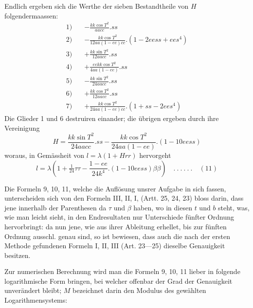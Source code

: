 %
Endlich ergeben sich die Werthe der sieben Bestandtheile von \(H\) folgendermaassen:
\[
\begin{aligned}
1)\quad&-\frac{kk\cos T^2}{aacc}\mathord{.}ss\\
2)\quad&-\frac{kk\cos T^2}{12aa(1-ee)cc}\mathord{.}(1-2eess+ees^4)\\
3)\quad&+\frac{kk\sin T^2}{12aacc}\mathord{.}ss\\
4)\quad&+\frac{eekk\cos T^2}{4aa(1-ee)}\mathord{.}ss\\
5)\quad&-\frac{kk\sin T^2}{24aacc}\mathord{.}ss\\
6)\quad&+\frac{kk\cos T^2}{12aacc}\mathord{.}ss\\
7)\quad&+\frac{kk\cos T^2}{24aa(1-ee)cc}\mathord{.}(1+ss-2ees^4)
\end{aligned}
\]
Die Glieder 1 und 6 destruiren einander; die übrigen ergeben durch ihre Vereinigung
\[
H=\frac{kk\sin T^2}{24aacc}\mathord{.}ss-\frac{kk\cos T^2}{24aa(1-ee)}\mathord{.}(1-10eess)
\]
woraus, in Gemässheit von \(l=\lambda(1+Hrr)\) hervorgeht
\[
l=\lambda(1+\tfrac1{24}\tau\tau-\frac{1-ee}{24k^4}\mathord{.}(1-10eess)\beta\beta)\quad .\ .\ .\ .\ .\ .\quad(11)
\]

Die Formeln 9, 10, 11, welche die Auflösung unsrer Aufgabe in sich fassen, unterscheiden sich von den Formeln III, II, I, (Artt. 25, 24, 23) bloss darin, dass jene innerhalb der Parenthesen da \(\tau\) und \(\beta\) haben, wo in diesen \(t\) und \(b\) steht, was, wie man leicht sieht, in den Endresultaten nur Unterschiede fünfter Ordnung hervorbringt: da nun jene, wie aus ihrer Ableitung erhellet, bis zur fünften Ordnung ausschl. genau sind, so ist bewiesen, dass auch die nach der ersten Methode gefundenen Formeln I, II, III (Art. 23---25) dieselbe Genauigkeit besitzen.

Zur numerischen Berechnung wird man die Formeln 9, 10, 11 lieber in folgende logarithmische Form bringen, bei welcher offenbar der Grad der Genauigkeit unverändert bleibt; \(M\) bezeichnet darin den Modulus des gewählten Logarithmensystems:
